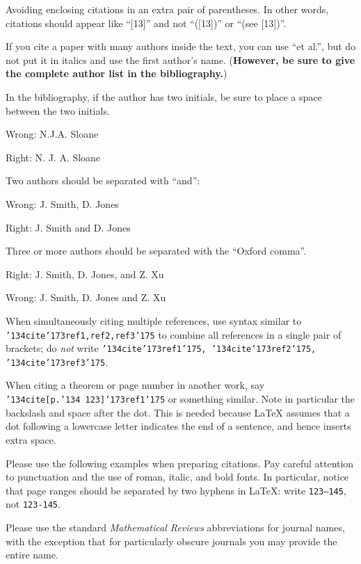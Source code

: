\documentclass[12pt]{article}
\begin{document}
	Avoiding enclosing citations in an extra pair of parentheses. 
In other words, citations should appear like ``[13]'' and not ``([13])'' or
``(see [13])''.

If you cite a paper with many authors inside the
text, you can use ``et al.'', but do
not put it in italics and use the first author's name.  ({\bf However, be sure
to give the complete author list in the bibliography.})

      In the bibliography, if the author has two initials, be sure
to place a space between the two initials. 

Wrong:  N.J.A. Sloane

Right:  N. J. A. Sloane

\medskip

      Two authors should be separated with ``and'':

Wrong:  J. Smith, D. Jones

Right:  J. Smith and D. Jones

\medskip

      Three or more authors should be separated with the ``Oxford
comma''.

Right:  J. Smith, D. Jones, and Z. Xu

Wrong:  J. Smith, D. Jones and Z. Xu

\medskip

      When simultaneously citing multiple references, use syntax
similar to {\tt \char'134cite\char'173ref1,ref2,ref3\char'175} to combine
all references in a single pair of brackets; do {\it not\/} write
{\tt \char'134cite\char'173ref1\char'175, \char'134cite\char'173ref2\char'175,
\char'134cite\char'173ref3\char'175}.

      When citing a theorem or page number in another work, say
{\tt \char'134cite[p.\char'134\ 123]\char'173ref1\char'175} or something
similar.  Note in particular the backslash and space after the dot.  This is
needed because LaTeX assumes that a dot following a lowercase letter indicates
the end of a sentence, and hence inserts extra space.

     Please use the following examples when preparing citations.
Pay careful attention to punctuation and the use of roman, italic,
and bold fonts.   In particular, notice that page ranges should be separated
by two hyphens in LaTeX:  write {\tt 123--145}, not {\tt 123-145}.

Please use the standard {\it Mathematical Reviews}
abbreviations for journal names, with the exception that for particularly
obscure journals you may provide the entire name.
\end{document}
